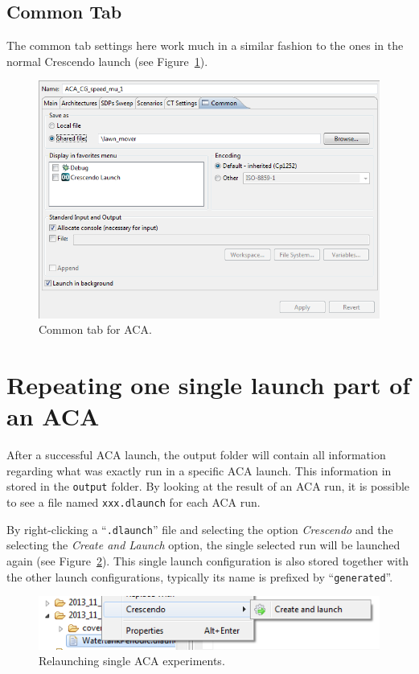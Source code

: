 \documentclass{crescendorepchap}
\begin{document}
\subsection{Common Tab}

The common tab settings here work much in a similar fashion to the ones in
the normal Crescendo launch (see Figure~\ref{fig:CommontabACA}). 

\begin{figure}[htbp]
\centering
\includegraphics[width=.6\textwidth]{images/CommontabACA.png}
\caption{Common tab for ACA.\label{fig:CommontabACA}}
\end{figure}

\section{Repeating one single launch part of an ACA}

After a successful ACA launch, the output folder will contain
all information regarding what was exactly run in a specific ACA launch.
This information in stored in the \texttt{output} folder. By looking at
the result of an ACA run, it is possible
to see a file named \texttt{xxx.dlaunch} for each ACA run.

By right-clicking a ``\texttt{.dlaunch}'' file and selecting the option
\emph{Crescendo} and the selecting the \emph{Create and Launch} option, 
the single selected run will
be launched again (see Figure~\ref{fig:CreateAndLaunchCommand}). 
This single launch configuration is also stored
together with the other launch configurations, typically its name is
prefixed by ``\texttt{generated}''.

\begin{figure}[htbp]
\centering
\includegraphics[width=.6\textwidth]{images/CreateAndLaunchCommand.png}
\caption{Relaunching single ACA experiments.\label{fig:CreateAndLaunchCommand}}
\end{figure}
\end{document}
